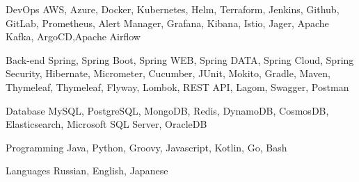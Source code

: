 

\begin{cvskills}

  \cvskill
    {DevOps} %
    {AWS, Azure, Docker, Kubernetes, Helm, Terraform, Jenkins, Github, GitLab, Prometheus,
     Alert Manager, Grafana, Kibana, Istio, Jager, Apache Kafka, ArgoCD,Apache Airflow} %

  \cvskill
    {Back-end} %
    {Spring, Spring Boot, Spring WEB, Spring DATA, Spring Cloud, Spring Security, Hibernate, 
    Micrometer, Cucumber, JUnit, Mokito, Gradle, Maven, Thymeleaf, Thymeleaf, Flyway, Lombok, REST API, Lagom, Swagger, Postman} %

  \cvskill
    {Database} %
    {MySQL, PostgreSQL, MongoDB, Redis, DynamoDB, CosmosDB, Elasticsearch,  Microsoft SQL Server, OracleDB} %

  \cvskill
    {Programming} %
    {Java, Python, Groovy, Javascript, Kotlin, Go, Bash} %

  \cvskill
    {Languages} %
    {Russian, English, Japanese} %

\end{cvskills}

